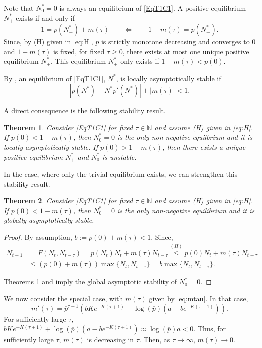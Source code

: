 \documentclass{article}
\newtheorem{theorem}{Theorem}
\numberwithin{theorem}{section}
\begin{document}
{Note that $N^*_0=0$ is always an equilibrium of \eqref{EqT1C1}. A positive equilibrium $N^*_+$ exists if and only if 
$$1=p(N^*_+)+m(\tau) \qquad \iff \qquad 1-m(\tau)=p(N^*_+).$$
Since, by (H) given in \eqref{eq:H}, $p$ is strictly monotone decreasing and converges  to $0$ and $1-m(\tau)$ is fixed, for fixed $\tau\geq 0$, there exists at most one unique positive equilibrium $N^*_+$. This equilibrium $N^*_+$ only exists if $1-m(\tau)<p(0)$. 

By \cite{Clark1976}, an equilibrium of \eqref{EqT1C1}, $N^*$, is locally asymptotically stable if 
\begin{equation}\label{Clargen}
\left|p(N^*)+N^*p'(N^*)\right|+|m(\tau)|<1.
\end{equation}

A direct consequence is the following stability result. 
\begin{theorem}\label{thm:1}
    Consider \eqref{EqT1C1} for fixed $\tau\in \mathbb{N}$ and assume (H) given in \eqref{eq:H}. If 
    $p(0)<1-m(\tau)$, then $N^*_0=0$ is the only non-negative equilbrium and it is locally asymptotically stable. If $p(0)>1-m(\tau)$, then there exists a unique positive equilibrium $N^*_+$ and $N^*_0$ is unstable. 
\end{theorem}

In the case, where only the trivial equilibrium exists, we can strengthen this stability result.

\begin{theorem}\label{thm:2}
    Consider \eqref{EqT1C1} for fixed $\tau\in \mathbb{N}$ and assume (H) given in \eqref{eq:H}. If 
    $p(0)<1-m(\tau)$, then $N^*_0=0$ is the only non-negative equilibrium and it is globally asymptotically stable.
\end{theorem}


\begin{proof}
 By assumption, $b:=p(0)+m(\tau)<1$. Since, 
\begin{align*}
    N_{t+1}&=F(N_t,N_{t-\tau})=p(N_t)N_t+m(\tau)N_{t-\tau}\stackrel{(H)}{\leq}p(0)N_t+m(\tau)N_{t-\tau}\\
    &\leq \left(p(0)+m(\tau)\right)\max\{N_t, N_{t-\tau}\}=b\max\{N_t, N_{t-\tau}\}.
\end{align*}

Theorems \ref{thm:1} and \cite[Theorem~2]{LIZ2002} imply the global asymptotic stability of $N^*_0=0$.  
\end{proof}

We now consider the special case, with $m(\tau)$ given by \eqref{eq:mtau}. In that case, 
$$m'(\tau)= \overline{p}^{\tau+1} \left(b K e^{-K (\tau+1)} +\log(\overline{p}) \left(a -be^{-K(\tau+1)}\right) \right).$$
For sufficiently large $\tau$, $b K e^{-K (\tau+1)} +\log(\overline{p}) \left(a -be^{-K(\tau+1)}\right)\approx \log(\overline{p})a<0$. Thus, for sufficiently large $\tau$, $m(\tau)$ is decreasing in $\tau$. Then, as $\tau\to \infty$, $m(\tau)\to 0$.    

}
\end{document}

